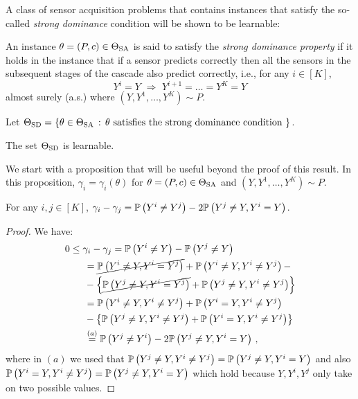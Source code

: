 A class of sensor acquisition problems that contains instances that satisfy the so-called \emph{strong dominance} condition 
will be shown to be learnable:
\begin{defi}
	An instance $\theta = (P,c)\in \Theta_{\mathrm{SA}}$  is said to satisfy the \emph{strong dominance property} if 
	it holds in the instance that if a sensor predicts correctly
	then all the sensors in the subsequent stages of the cascade also predict correctly, i.e., 
	for any $i\in [K]$,
	\begin{equation}
	\label{eqn:DominanceCondition}
	Y^i=Y \,\, \Rightarrow\,\, Y^{i+1}= \dots =  Y^K = Y
	\end{equation}
	almost surely (a.s.)
	where $(Y,Y^1,\dots,Y^K)\sim P$.
\end{defi}
Let $\Theta_{\mathrm{SD}} = \{ \theta\in \Theta_{\mathrm{SA}}\,:\, \theta \text{ satisfies the strong dominance condition } \}$.
\begin{thm}
\label{thm:tsdlearnable}
The set $\Theta_{\mathrm{SD}}$ is learnable.
\end{thm}
We start with a proposition that will be useful beyond the proof of this result.
In this proposition, $\gamma_i = \gamma_i(\theta)$ for $\theta=(P,c)\in \Theta_{\mathrm{SA}}$ and $(Y,Y^1,\dots,Y^K) \sim P$.
\begin{prop}\label{prop:gammadiff}
For any $i,j\in [K]$, $\gamma_i - \gamma_j = \mathbb{P}\left(Y^i\ne Y^j\right) - 2\mathbb{P}\left( Y^j \ne Y, Y^i=Y\right)$.
\end{prop}
\begin{proof}
We have:
\begin{align*}
\MoveEqLeft 0  \le \gamma_i  - \gamma_j = \Prob{Y^i\ne Y} - \Prob{Y^j\ne Y} \\
& = \cancel{\Prob{Y^i\ne Y, Y^i=Y^j}} + \Prob{ Y^i\ne Y, Y^i\ne Y^j } - \\
& - \left\{ 
       \cancel{\Prob{Y^j\ne Y, Y^i=Y^j}} + \Prob{ Y^j\ne Y, Y^i\ne Y^j }\right\}\\
& = \Prob{ Y^i\ne Y, Y^i \ne Y^j } + \Prob{Y^i=Y,Y^i\ne Y^j}       \\
& - \left\{ 
	  \Prob{ Y^j \ne Y, Y^i\ne Y^j } + \Prob{ Y^i=Y,Y^i\ne Y^j}
	 \right\}\\
& \stackrel{\footnotesize (a)}{=} \Prob{ Y^j \ne Y^i } -2 \Prob{ Y^j\ne Y, Y^i = Y }\,,
\end{align*}
where in $(a)$ we used that $\mathbb{P}\left( Y^j \ne Y, Y^i\ne Y^j \right) =  \mathbb{P}\left( Y^j\ne Y,Y^i= Y\right)$ and also
$\mathbb{P}\left( Y^i=Y,Y^i\ne Y^j\right) = \mathbb{P}\left( Y^j\ne Y,Y^i= Y\right)$
which hold because $Y,Y^i,Y^j$ only take on two possible values.
\end{proof}
